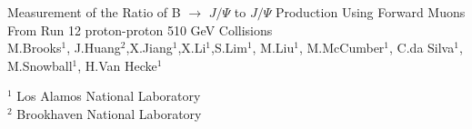 \documentclass[12pt]{article}
\newcommand{\pt}{$P_{t}$ }
\newcommand{\jpsi}{$J/\Psi$ }
\begin{document}
\begin{titlepage}
\begin{center}
 {\LARGE Measurement of the Ratio of B $\to$ \jpsi to \jpsi Production Using Forward Muons From Run 12 proton-proton 510 GeV Collisions} \\
\vspace{15mm}
M.Brooks$^{\mbox{1}}$, J.Huang$^{\mbox{2}}$,X.Jiang$^{\mbox{1}}$,X.Li$^{\mbox{1}}$,S.Lim$^{\mbox{1}}$, M.Liu$^{\mbox{1}}$, M.McCumber$^{\mbox{1}}$, C.da Silva$^{\mbox{1}}$, M.Snowball$^{\mbox{1}}$, H.Van Hecke$^{\mbox{1}}$

\vspace{1cm}

$^{\mbox{1}}$ Los Alamos National Laboratory \\
$^{\mbox{2}}$ Brookhaven National Laboratory  \\
\end{center}

\vspace{2cm}
\date{today}

\vspace{2cm}




\begin{abstract}

With the addition of the Forward Vertex detector to the PHENIX experiment, it is now possible to precisely measure the vertex position in 
both heavy ion and proton-proton events.  This precision gives the ability to measure the Distance of Closest Approach of all tracks to
the precisely measured vertex, allowing one to discern prompt muons from heavy flavor decays that fly some distance before decaying.
In this paper, Run 12 proton-proton collisions at $\sqrt{s} = $ 510 GeV from the PHENIX experiment will be analyzed using the DCA to 
discriminate between B $\to$ \jpsi and prompt \jpsi's decaying into muons Finally, a ratio of B to \jpsi production by \pt is presented.

\end{abstract}

\end{titlepage}
\end{document}
